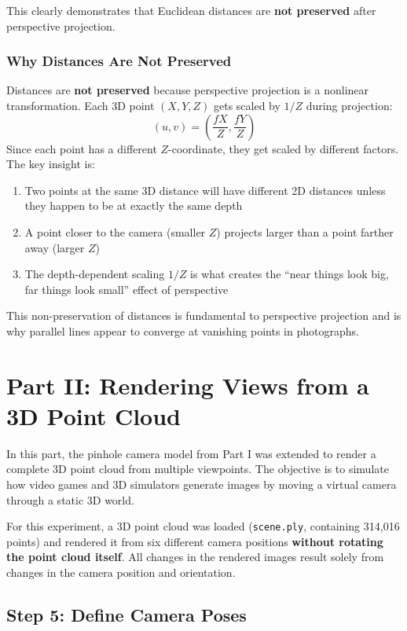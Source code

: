 \documentclass[12pt]{article}
\begin{document}
This clearly demonstrates that Euclidean distances are \textbf{not preserved} after perspective projection.

\subsubsection*{Why Distances Are Not Preserved}

Distances are \textbf{not preserved} because perspective projection is a nonlinear transformation. Each 3D point $(X, Y, Z)$ gets scaled by $1/Z$ during projection:
\[
(u, v) = \left(\frac{fX}{Z}, \frac{fY}{Z}\right)
\]
Since each point has a different $Z$-coordinate, they get scaled by different factors. The key insight is:
\begin{enumerate}
    \item Two points at the same 3D distance will have different 2D distances unless they happen to be at exactly the same depth
    \item A point closer to the camera (smaller $Z$) projects larger than a point farther away (larger $Z$)
    \item The depth-dependent scaling $1/Z$ is what creates the ``near things look big, far things look small'' effect of perspective
\end{enumerate}

This non-preservation of distances is fundamental to perspective projection and is why parallel lines appear to converge at vanishing points in photographs.

\newpage
\section*{Part II: Rendering Views from a 3D Point Cloud}

In this part, the pinhole camera model from Part I  was extended to render a complete 3D point cloud from multiple viewpoints. The objective is to simulate how video games and 3D simulators generate images by moving a virtual camera through a static 3D world.

For this experiment, a 3D point cloud was loaded (\texttt{scene.ply}, containing 314,016 points) and rendered it from six different camera positions \textbf{without rotating the point cloud itself}. All changes in the rendered images result solely from changes in the camera position and orientation.

\subsection*{Step 5: Define Camera Poses}
\end{document}
